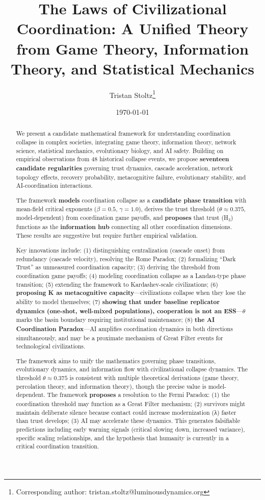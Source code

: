 \documentclass[11pt,letterpaper]{article}
\title{The Laws of Civilizational Coordination: A Unified Theory from Game Theory, Information Theory, and Statistical Mechanics}
\author[1]{Tristan Stoltz\thanks{Corresponding author: tristan.stoltz@luminousdynamics.org}}
\affil[1]{Luminous Dynamics, LLC}
\date{\today}
\begin{document}
\linenumbers  %

\maketitle

\begin{abstract}
We present a candidate mathematical framework for understanding
coordination collapse in complex societies, integrating game theory,
information theory, network science, statistical mechanics, evolutionary
biology, and AI safety. Building on empirical observations from 48
historical collapse events, we propose \textbf{seventeen candidate
regularities} governing trust dynamics, cascade acceleration, network
topology effects, recovery probability, metacognitive failure,
evolutionary stability, and AI-coordination interactions.

The framework \textbf{models} coordination collapse as a
\textbf{candidate phase transition} with mean-field critical exponents
($\beta = 0.5$, $\gamma = 1.0$), derives the trust threshold ($\theta \approx 0.375$,
model-dependent) from coordination game payoffs, and \textbf{proposes}
that trust (H$_3$) functions as the \textbf{information hub} connecting all
other coordination dimensions. These results are suggestive but require
further empirical validation.

Key innovations include: (1) distinguishing centralization (cascade
onset) from redundancy (cascade velocity), resolving the Rome Paradox;
(2) formalizing ``Dark Trust'' as unmeasured coordination capacity; (3)
deriving the threshold from coordination game payoffs; (4) modeling
coordination collapse as a Landau-type phase transition; (5) extending
the framework to Kardashev-scale civilizations; (6) \textbf{proposing K
as metacognitive capacity}---civilizations collapse when they lose the
ability to model themselves; (7) \textbf{showing that under baseline
replicator dynamics (one-shot, well-mixed populations), cooperation is
not an ESS}---$\theta$ marks the basin boundary requiring institutional
maintenance; (8) \textbf{the AI Coordination Paradox}---AI amplifies
coordination dynamics in both directions simultaneously, and may be a
proximate mechanism of Great Filter events for technological
civilizations.

The framework aims to unify the mathematics governing phase transitions,
evolutionary dynamics, and information flow with civilizational collapse
dynamics. The threshold $\theta \approx 0.375$ is consistent with multiple
theoretical derivations (game theory, percolation theory, and
information theory), though the precise value is model-dependent. The
framework \textbf{proposes} a resolution to the Fermi Paradox: (1) the
coordination threshold may function as a Great Filter mechanism; (2)
survivors might maintain deliberate silence because contact could
increase modernization (λ) faster than trust develops; (3) AI may
accelerate these dynamics. This generates falsifiable predictions
including early warning signals (critical slowing down, increased
variance), specific scaling relationships, and the hypothesis that
humanity is currently in a critical coordination transition.
\end{abstract}
\end{document}
